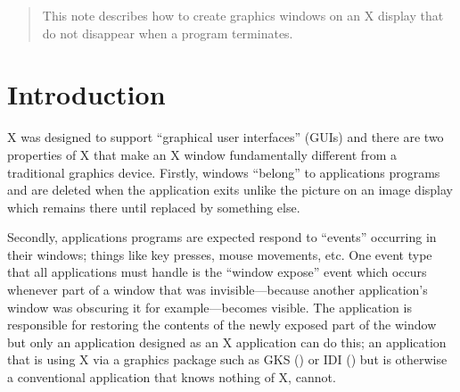 %

\begin{quote}
This note describes how to create graphics windows on an X display that do not
disappear when a program terminates.
\end{quote}
\section{Introduction}

X was designed to support ``graphical user interfaces'' (GUIs) and there are two
properties of X that make an X window fundamentally different from a
traditional graphics device.
Firstly, windows ``belong'' to applications programs and are deleted when the
application exits unlike the picture on an image display which remains there
until replaced by something else. 

Secondly, applications
programs are expected respond to ``events'' occurring in their windows;
things like key presses, mouse movements, etc. One event type that all
applications must handle is the ``window expose'' event which occurs whenever
part of a window that was invisible---because another application's window was
obscuring it for example---becomes visible. The application is responsible for
restoring the contents of the newly exposed part of the window but only an
application designed as an X application can do this; an application that is
using X via a graphics package such as GKS ()
or IDI () but is otherwise a
conventional application that knows nothing of X, cannot.

